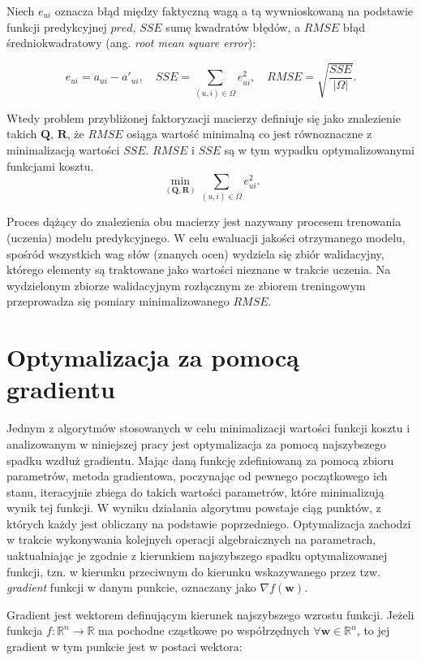 \documentclass{pracamgr}
\newcommand{\abs}[1]{\lvert#1\rvert}
\begin{document}
Niech $e_{ui}$ oznacza błąd między faktyczną wagą a tą wywnioskowaną na podstawie funkcji predykcyjnej $pred$, $SSE$ sumę kwadratów błędów, a $RMSE$ błąd średniokwadratowy (ang. \textit{root mean square error}):

\[
e_{ui} = a_{ui} - a'_{ui}, \quad SSE = \sum_{(u,i) \in \Omega} e_{ui}^2, \quad RMSE = \sqrt{\frac{SSE}{\abs{\Omega}}}.
\]

Wtedy problem przybliżonej faktoryzacji macierzy definiuje się jako znalezienie takich $\mathbf{Q}$, $\mathbf{R}$, że $RMSE$ osiąga wartość minimalną co jest równoznaczne z minimalizacją wartości $SSE$. $RMSE$ i $SSE$ są w tym wypadku optymalizowanymi funkcjami kosztu.
\[
\min_{(\mathbf{Q}, \mathbf{R})} \sum_{(u,i) \in \Omega} e_{ui}^2.
\]

Proces dążący do znalezienia obu macierzy jest nazywany procesem trenowania (uczenia) modelu predykcyjnego. W celu ewaluacji jakości otrzymanego modelu, spośród wszystkich wag słów (znanych ocen) wydziela się zbiór walidacyjny, którego elementy są traktowane jako wartości nieznane w trakcie uczenia. Na wydzielonym zbiorze walidacyjnym rozłącznym ze zbiorem treningowym przeprowadza się pomiary minimalizowanego $RMSE$.

\section{Optymalizacja za pomocą gradientu}
Jednym z algorytmów stosowanych w celu minimalizacji wartości funkcji kosztu i analizowanym w niniejszej pracy jest optymalizacja za pomocą najszybszego spadku wzdłuż gradientu. Mając daną funkcję zdefiniowaną za pomocą zbioru parametrów, metoda gradientowa, poczynając od pewnego początkowego ich stanu, iteracyjnie zbiega do takich wartości parametrów, które minimalizują wynik tej funkcji. W wyniku działania algorytmu powstaje ciąg punktów, z których każdy jest obliczany na podstawie poprzedniego. Optymalizacja zachodzi w trakcie wykonywania kolejnych operacji algebraicznych na parametrach, uaktualniając je zgodnie z kierunkiem najszybszego spadku optymalizowanej funkcji, tzn. w kierunku przeciwnym do kierunku wskazywanego przez tzw. \textit{gradient} funkcji w danym punkcie, oznaczany jako $\nabla f(\mathbf{w})$. 

Gradient jest wektorem definującym kierunek najszybszego wzrostu funkcji.
Jeżeli funkcja $f: \mathbb{R}^n \rightarrow \mathbb{R}$ ma pochodne cząstkowe po współrzędnych $\forall \mathbf{w} \in \mathbb{R}^n$, to jej gradient w tym punkcie jest w postaci wektora:
\end{document}
